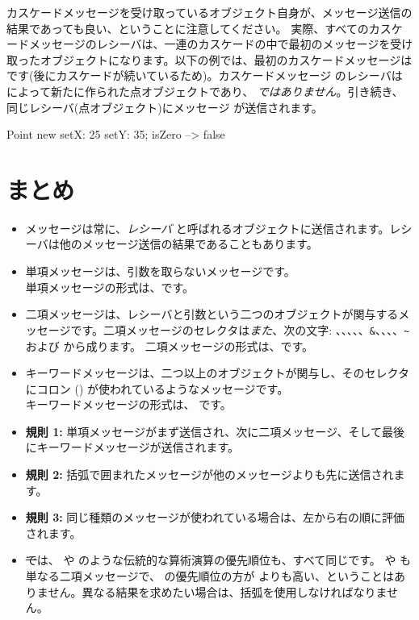 \documentclass[a4paper,10pt,twoside]{book}
\begin{document}
カスケードメッセージを受け取っているオブジェクト自身が、メッセージ送信の結果であっても良い、ということに注意してください。
実際、すべてのカスケードメッセージのレシーバは、一連のカスケードの中で最初のメッセージを受け取ったオブジェクトになります。以下の例では、最初のカスケードメッセージは  です(後にカスケードが続いているため)。カスケードメッセージ  のレシーバは  によって新たに作られた点オブジェクトであり、 \emph{ではありません}。引き続き、同じレシーバ(点オブジェクト)にメッセージ  が送信されます。

\begin{code}{}
Point new setX: 25 setY: 35; isZero --> false
\end{code}

\section{まとめ}

\begin{itemize}
\item メッセージは常に、\emph{レシーバ} と呼ばれるオブジェクトに送信されます。レシーバは他のメッセージ送信の結果であることもあります。

\item 単項メッセージは、引数を取らないメッセージです。\\
単項メッセージの形式は、です。

\item 二項メッセージは、レシーバと引数という二つのオブジェクトが関与するメッセージです。二項メッセージのセレクタは\emph{また}、次の文字: \ct{+}、\ct{-}、\ct{*}、\ct{/}、\ct{|}、\texttt{\&}、\ct{=}、\ct{>}、\ct{<}、\texttt{\~} および  から成ります。
二項メッセージの形式は、です。
\item キーワードメッセージは、二つ以上のオブジェクトが関与し、そのセレクタにコロン (\ct{:}) が使われているようなメッセージです。\\
キーワードメッセージの形式は、
です。

\item \textbf{規則 1:} 単項メッセージがまず送信され、次に二項メッセージ、そして最後にキーワードメッセージが送信されます。
\item \textbf{規則 2:} 括弧で囲まれたメッセージが他のメッセージよりも先に送信されます。
\item \textbf{規則 3:} 同じ種類のメッセージが使われている場合は、左から右の順に評価されます。
\item \st では、\ct{+} や \ct{*} のような伝統的な算術演算の優先順位も、すべて同じです。\ct{+} や \ct{*} も単なる二項メッセージで、\ct{*} の優先順位の方が \ct{+} よりも高い、ということはありません。異なる結果を求めたい場合は、括弧を使用しなければなりません。
\end{itemize}

\ifx\wholebook\relax\else
\end{document}
